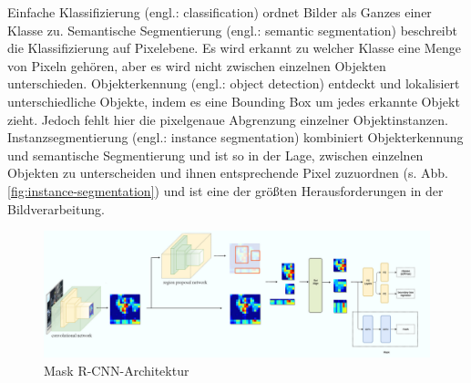 \noindent
Einfache Klassifizierung (engl.: classification) ordnet Bilder als Ganzes einer Klasse zu. Semantische Segmentierung (engl.: semantic segmentation) beschreibt die Klassifizierung auf Pixelebene. Es wird erkannt zu welcher Klasse eine Menge von Pixeln gehören, aber es wird nicht zwischen einzelnen Objekten unterschieden. Objekterkennung (engl.: object detection) entdeckt und lokalisiert unterschiedliche Objekte, indem es eine Bounding Box um jedes erkannte Objekt zieht. Jedoch fehlt hier die pixelgenaue Abgrenzung einzelner Objektinstanzen. Instanzsegmentierung (engl.: instance segmentation) kombiniert Objekterkennung und semantische Segmentierung und ist so in der Lage, zwischen einzelnen Objekten zu unterscheiden und ihnen entsprechende Pixel zuzuordnen (s. Abb. \ref{fig:instance-segmentation}) und ist eine der größten Herausforderungen in der Bildverarbeitung.\cite[S. 2ff.]{ref:maskrcnn}
\\
\begin{figure}[ht]
  \centering
  \includegraphics[width=\textwidth]{pics/maskrcnn-archtecture.PNG}
  \caption[Mask R-CNN-Architektur]{Mask R-CNN-Architektur\cite{ref:mask-rcnn-architecture}}
  \label{fig:maskrcnn-architecture}
\end{figure}

